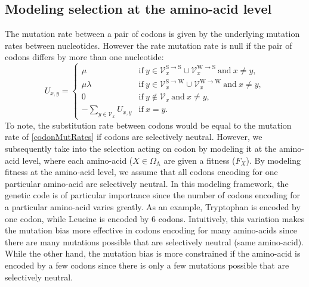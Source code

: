 \documentclass{article}
\newcommand{\SetAa}{\Omega_{\mathrm{A}}}
\newcommand{\Neighbor}{\mathcal{V}}
\newcommand{\Nx}{\Neighbor_x}
\newcommand{\NxWS}{\Neighbor_x^{\mathrm{W} \rightarrow \mathrm{S}}}
\newcommand{\NxSS}{\Neighbor_x^{\mathrm{S} \rightarrow \mathrm{S}}}
\newcommand{\NxSW}{\Neighbor_x^{\mathrm{S} \rightarrow \mathrm{W}}}
\newcommand{\NxWW}{\Neighbor_x^{\mathrm{W} \rightarrow \mathrm{W}}}
\begin{document}
    \subsection{Modeling selection at the amino-acid level}
    The mutation rate between a pair of codons is given by the underlying mutation rates between nucleotides. However the rate mutation rate is null if the pair of codons differs by more than one nucleotide:
    \begin{equation}
        \label{codonMutRates}
        U_{x, y} =
        \begin{cases}
            \mu
            & \mathrm{if} \ y \in  \NxSS \cup \NxWS \ \mathrm{ and } \ x \neq y, \\
            \mu \lambda
            & \mathrm{if} \ y \in \NxSW \cup \NxWW   \ \mathrm{ and } \ x \neq y, \\
            0
            & \mathrm{if} \  y \notin \Nx \ \mathrm{ and } \ x \neq y, \\
            - \sum_{y \in \Nx }  U_{x, y} & \mathrm{if} \ x = y.
        \end{cases}
    \end{equation}
    To note, the substitution rate between codons would be equal to the mutation rate of \ref{codonMutRates} if codons are selectively neutral. However, we subsequently take into the selection acting on codon by modeling it at the amino-acid level, where each amino-acid ($X \in \SetAa$ are given a fitness ($F_X$). By modeling fitness at the amino-acid level, we assume that all codons encoding for one particular amino-acid are selectively neutral. In this modeling framework, the genetic code is of particular importance since the number of codons encoding for a particular amino-acid varies greatly. As an example, Tryptophan is encoded by one codon, while Leucine is encoded by 6 codons. Intuitively, this variation makes the mutation bias more effective in codons encoding for many amino-acids since there are many mutations possible that are selectively neutral (same amino-acid). While the other hand, the mutation bias is more constrained if the amino-acid is encoded by a few codons since there is only a few mutations possible that are selectively neutral.\\
\end{document}
